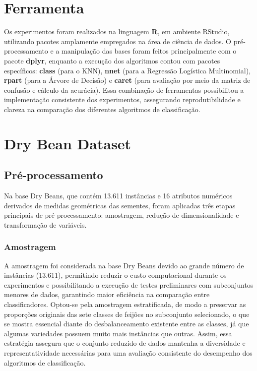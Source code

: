 \documentclass[
  letterpaper,
  DIV=11,
  numbers=noendperiod]{scrartcl}
\begin{document}
\section{Ferramenta}\label{ferramenta}

Os experimentos foram realizados na linguagem \textbf{R}, em ambiente
RStudio, utilizando pacotes amplamente empregados na área de ciência de
dados. O pré-processamento e a manipulação das bases foram feitos
principalmente com o pacote \textbf{dplyr}, enquanto a execução dos
algoritmos contou com pacotes específicos: \textbf{class} (para o KNN),
\textbf{nnet} (para a Regressão Logística Multinomial), \textbf{rpart}
(para a Árvore de Decisão) e \textbf{caret} (para avaliação por meio da
matriz de confusão e cálculo da acurácia). Essa combinação de
ferramentas possibilitou a implementação consistente dos experimentos,
assegurando reprodutibilidade e clareza na comparação dos diferentes
algoritmos de classificação.

\section{Dry Bean Dataset}\label{dry-bean-dataset-1}

\subsection{Pré-processamento}\label{pruxe9-processamento}

Na base Dry Beans, que contém 13.611 instâncias e 16 atributos numéricos
derivados de medidas geométricas das sementes, foram aplicadas três
etapas principais de pré-processamento: amostragem, redução de
dimensionalidade e transformação de variáveis.

\subsubsection{Amostragem}\label{amostragem}

A amostragem foi considerada na base Dry Beans devido ao grande número
de instâncias (13.611), permitindo reduzir o custo computacional durante
os experimentos e possibilitando a execução de testes preliminares com
subconjuntos menores de dados, garantindo maior eficiência na comparação
entre classificadores. Optou-se pela amostragem estratificada, de modo a
preservar as proporções originais das sete classes de feijões no
subconjunto selecionado, o que se mostra essencial diante do
desbalanceamento existente entre as classes, já que algumas variedades
possuem muito mais instâncias que outras. Assim, essa estratégia
assegura que o conjunto reduzido de dados mantenha a diversidade e
representatividade necessárias para uma avaliação consistente do
desempenho dos algoritmos de classificação.
\end{document}
